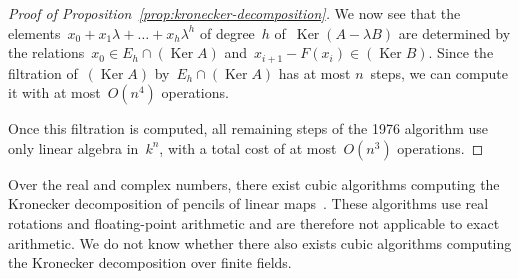 \documentclass{lms}
\DeclareMathOperator\Ker{Ker}
\begin{document}
\begin{proof}[Proof of Proposition~\ref{prop:kronecker-decomposition}]
We now see that the elements~$x_0 + x_1 λ + … + x_h λ^h$
of degree~$h$ of~$\Ker(A - λ B)$
are determined by the relations~$x_0 ∈ E_{h} ∩ (\Ker A)$
and~$x_{i+1} - F (x_i) ∈ (\Ker B)$.
Since the filtration of~$(\Ker A)$ by~$E_{h} ∩ (\Ker A)$
has at most $n$~steps, we can compute it with at most~$O(n^4)$ operations.

Once this filtration is computed,
all remaining steps of the 1976 algorithm use only linear algebra in~$k^n$,
with a total cost of at most~$O(n^3)$ operations.
\end{proof}

Over the real and complex numbers,
there exist cubic algorithms computing the Kronecker decomposition
of pencils of linear maps~\cite{beelen1988improved}.
These algorithms use real rotations and floating-point arithmetic
and are therefore not applicable to exact arithmetic.
We do not know whether there also exists cubic algorithms
computing the Kronecker decomposition over finite fields.
\end{document}
